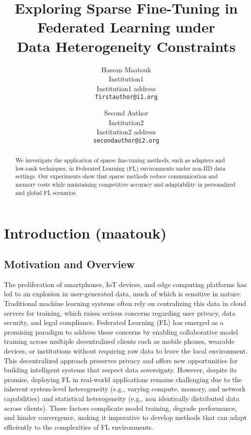 \documentclass[10pt,twocolumn,letterpaper]{article}
\begin{document}
\title{Exploring Sparse Fine-Tuning in Federated Learning under \\ Data Heterogeneity Constraints}

\author{Hassan Maatouk\\
Institution1\\
Institution1 address\\
{\tt\small firstauthor@i1.org}
\and
Second Author\\
Institution2\\
Institution2 address\\
{\tt\small secondauthor@i2.org}
}
\maketitle

\begin{abstract}
We investigate the application of sparse fine-tuning methods, such as adapters and low-rank techniques, in Federated Learning (FL) environments under non-IID data settings. Our experiments show that sparse methods reduce communication and memory costs while maintaining competitive accuracy and adaptability in personalized and global FL scenarios.
\end{abstract}

\section{Introduction (maatouk)}
\label{sec:intro}

\subsection{Motivation and Overview}

The proliferation of smartphones, IoT devices, and edge computing platforms has led to an explosion in user-generated data, much of which is sensitive in nature. Traditional machine learning systems often rely on centralizing this data in cloud servers for training, which raises serious concerns regarding user privacy, data security, and legal compliance. Federated Learning (FL) has emerged as a promising paradigm to address these concerns by enabling collaborative model training across multiple decentralized clients such as mobile phones, wearable devices, or institutions without requiring raw data to leave the local environment. This decentralized approach preserves privacy and offers new opportunities for building intelligent systems that respect data sovereignty. However, despite its promise, deploying FL in real-world applications remains challenging due to the inherent system-level heterogeneity (e.g., varying compute, memory, and network capabilities) and statistical heterogeneity (e.g., non identically distributed data across clients). These factors complicate model training, degrade performance, and hinder convergence, making it imperative to develop methods that can adapt efficiently to the complexities of FL environments.
\end{document}

